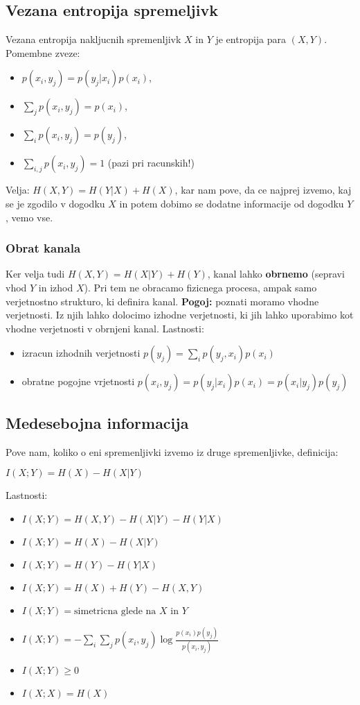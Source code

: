 \documentclass{article}
\begin{document}
\begin{multicols}{4}
\subsection{Vezana entropija spremeljivk}
Vezana entropija nakljucnih spremenljivk $X$ in $Y$ je entropija para $(X, Y)$.
Pomembne zveze:
\begin{itemize}
    \item $p(x_i, y_j) = p(y_j| x_i)p(x_i)$,
    \item $\sum_j p(x_i, y_j) = p(x_i)$,
    \item $\sum_i p(x_i, y_j) = p(y_j)$,
    \item $\sum_{i,j} p(x_i, y_j) = 1$ (pazi pri racunskih!)
\end{itemize}
Velja: $H(X, Y) = H(Y|X) + H(X)$, kar nam pove, da ce najprej izvemo, kaj se je zgodilo v dogodku $X$ in potem
dobimo se dodatne informacije od dogodku $Y$, vemo vse.
\subsubsection{Obrat kanala}
Ker velja tudi $H(X, Y) = H(X|Y) + H(Y)$, kanal lahko \textbf{obrnemo}
(sepravi vhod $Y$ in izhod $X$). Pri tem ne obracamo fizicnega procesa, ampak samo verjetnostno strukturo, ki definira kanal. \textbf{Pogoj:}  poznati moramo vhodne verjetnosti. Iz njih lahko dolocimo izhodne verjetnosti, ki jih lahko
uporabimo kot vhodne verjetnosti v obrnjeni kanal.
Lastnosti:
\begin{itemize}
    \item izracun izhodnih verjetnosti $p(y_j) = \sum_i p(y_j, x_i)p(x_i)$
    \item obratne pogojne vrjetnosti $p(x_i, y_j)= p(y_j|x_i)p(x_i) = p(x_i|y_j)p(y_j)$
\end{itemize}

\subsection{Medesebojna informacija}
Pove nam, koliko o eni spremenljivki izvemo iz druge spremenljivke,
definicija:
\begin{center}
    \begin{math}
        I(X;Y) = H(X) - H(X|Y)
    \end{math}
\end{center}
Lastnosti:
\begin{itemize}
    \item $I(X;Y) = H(X, Y) - H(X|Y) - H(Y|X)$
    \item $I(X;Y) = H(X) - H(X|Y)$
    \item $I(X;Y) = H(Y) - H(Y|X)$
    \item $I(X;Y) = H(X) + H(Y) - H(X, Y)$
    \item $I(X;Y) = \text{simetricna glede na } X \text{ in } Y$
    \item $I(X;Y) = -\sum_i\sum_j p(x_i, y_j) \log \frac{p(x_i)p(y_j)}{p(x_i, y_j)}$
    \item $I(X;Y) \geq 0$
    \item $I(X;X) = H(X)$
\end{itemize}


\end{multicols}
\end{document}
